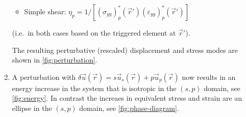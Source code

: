 \documentclass{goose-article}
\begin{document}
\begin{enumerate}
\begin{itemize}
        \item Simple shear:
        $\eta_p = 1 / [(\sigma_{yy})^*_p (\vec{r}') (\varepsilon_{yy})^*_p (\vec{r}')]$
    \end{itemize}
    (i.e.\ in both cases based on the triggered element at $\vec{r}'$).

    The resulting perturbative (rescaled) displacement and stress modes
    are shown in \cref{fig:perturbation}.

    \item A perturbation with
    $\delta \vec{u}(\vec{r}) = s \vec{u}_s (\vec{r}) + p \vec{u}_p (\vec{r})$
    now results in an energy increase in the system that is isotropic in the $(s, p)$ domain,
    see \cref{fig:energy}.
    In contrast the increaes in equivalent stress and strain are an ellipse in the $(s, p)$ domain,
    see \cref{fig:phase-diagram}.

\end{enumerate}
\end{document}
